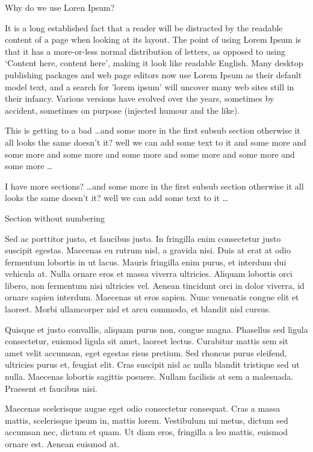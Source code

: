 Why do we use Loren Ipsum? %

It is a long established fact that a reader will be distracted by the readable content of a page when looking at its layout. The point of using Lorem Ipsum is that it has a more-or-less normal distribution of letters, as opposed to using `Content here, content here', making it look like readable English. Many desktop publishing packages and web page editors now use Lorem Ipsum as their default model text, and a search for 'lorem ipsum' will uncover many web sites still in their infancy. Various versions have evolved over the years, sometimes by accident, sometimes on purpose (injected humour and the like).


This is getting to a bad %
\dots and some more in the first subsub section otherwise it all looks the same
doesn't it? well we can add some text to it and some more and some more and
some more and some more and some more and some more and some more \dots

I have more sections? %
\dots and some more in the first subsub section otherwise it all looks the same
doesn't it? well we can add some text to it \dots

Section without numbering %

Sed ac porttitor justo, et faucibus justo. In fringilla enim consectetur justo 
suscipit egestas. Maecenas eu rutrum nisl, a gravida nisi. Duis at erat at odio 
fermentum lobortis in ut lacus. Mauris fringilla enim purus, et interdum dui 
vehicula at. Nulla ornare eros et massa viverra ultricies. Aliquam lobortis 
orci libero, non fermentum nisi ultricies vel. Aenean tincidunt orci in dolor 
viverra, id ornare sapien interdum. Maecenas ut eros sapien. Nunc venenatis 
congue elit et laoreet. Morbi ullamcorper nisl et arcu commodo, et blandit nisl 
cursus.

Quisque et justo convallis, aliquam purus non, congue magna. Phasellus sed 
ligula consectetur, euismod ligula sit amet, laoreet lectus. Curabitur mattis 
sem sit amet velit accumsan, eget egestas risus pretium. Sed rhoncus purus 
eleifend, ultricies purus et, feugiat elit. Cras suscipit nisl ac nulla blandit 
tristique sed ut nulla. Maecenas lobortis sagittis posuere. Nullam facilisis at 
sem a malesuada. Praesent et faucibus nisi.

Maecenas scelerisque augue eget odio consectetur consequat. Cras a massa 
mattis, scelerisque ipsum in, mattis lorem. Vestibulum mi metus, dictum sed 
accumsan nec, dictum et quam. Ut diam eros, fringilla a leo mattis, euismod 
ornare est. Aenean euismod at. 
